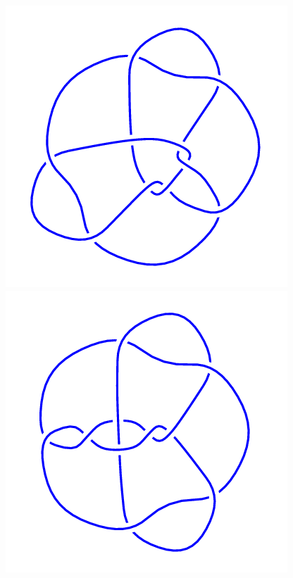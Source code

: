 \begin{figure}[H]
    \begin{minipage}[b]{.18\linewidth}
        \centering
        \includegraphics[width=\linewidth]{../data/10_157.png}
    \end{minipage}
    \begin{minipage}[b]{.18\linewidth}
        \centering
        \includegraphics[width=\linewidth]{../data/10_158.png}

\end{minipage}
\end{figure}
